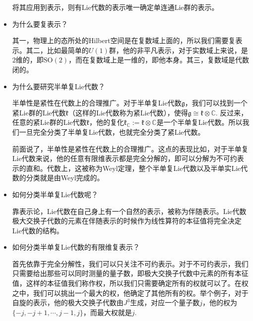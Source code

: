 \documentclass[9pt]{extarticle}
\newcommand{\cc}{\mathbb{C}}
\newcommand{\lag}{{\mathfrak{g}}}
\begin{document}
\begin{itemize}
将其应用到表示，则有Lie代数的表示唯一确定单连通Lie群的表示。

\item 为什么要复表示？

其一，物理上的态所处的Hilbert空间是在复数域上面的，所以我们需要复表示。其二，比如最简单的$U(1)$群，他的非平凡表示，对于实数域上来说，是$2$维的，即$\mathrm{SO}(2)$，而在复数域上是一维的，即他本身。其三，复数域是代数闭的。

\item 为什么要研究半单复Lie代数？

半单性是紧性在代数上的合理推广。对于半单复Lie代数$\lag$，我们可以找到一个紧Lie群的Lie代数$\mathfrak{k}$（这样的Lie代数称为紧Lie代数），使得$\lag\cong \mathfrak{k}\otimes \cc$. 反过来，任意的紧Lie群的Lie代数$\mathfrak{k}$，他的复化$\mathfrak{k}_{\cc}:=\mathfrak{k}\otimes \cc$是一个半单复Lie代数。所以我们一旦完全分类了半单复Lie代数，也就完全分类了紧Lie代数。

前面说了，半单性是紧性在代数上的合理推广。这点的表现比如，对于半单复Lie代数来说，他的任意有限维表示都是完全分解的，即可以分解为不可约表示的直和。代数上，这被称为Weyl定理，整个半单复Lie代数以及半单实Lie代数的分类就是由Weyl完成的。

\item 如何分类半单复Lie代数呢？

靠表示论，Lie代数在自己身上有一个自然的表示，被称为伴随表示。Lie代数极大交换子代数的元素在伴随表示的时候作为线性算符的本征值将完全决定Lie代数的结构。

\item 如何分类半单复Lie代数的有限维复表示？

首先依靠于完全分解性，我们可以只关注不可约表示。对于不可约表示，我们只需要给出那些可以同时测量的量子数，即极大交换子代数中元素的所有本征值，这样的本征值我们称作权，所以我们只需要确定所有的权就可以了。在权之中，我们可以挑出一个最大的权，他确定了其他所有的权。举个例子，对于自旋的表示，他的极大交换子代数由$J^3$生成，对应一个量子数$j$，他的权为$\{-j,-j+1,\cdots,j-1,j\}$，而最大权就是$j$.

\end{itemize}


\end{document}
